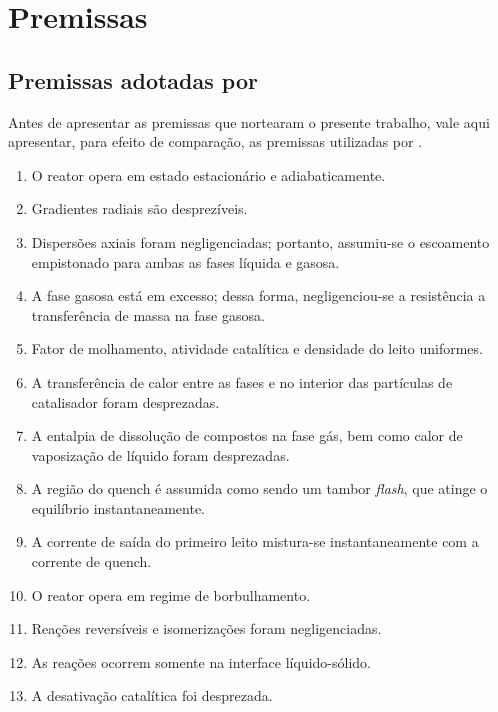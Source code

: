 
\section{Premissas} \label{sec:premissas}

\subsection{Premissas adotadas por }
\label{sec:premissasrojas}

Antes de apresentar as premissas que nortearam o presente trabalho, vale
aqui apresentar, para efeito de comparação, as premissas utilizadas por
.

\begin{enumerate}
  \item O reator opera em estado estacionário e adiabaticamente.
  \item Gradientes radiais são desprezíveis.
  \item Dispersões axiais foram negligenciadas; portanto, assumiu-se o
  escoamento empistonado para ambas as fases líquida e gasosa.
  \item A fase gasosa está em excesso; dessa forma, negligenciou-se a
  resistência a transferência de massa na fase gasosa.
  \item Fator de molhamento, atividade catalítica e densidade do leito
  uniformes.
  \item A transferência de calor entre as fases e no interior das partículas de
  catalisador foram desprezadas.
  \item A entalpia de dissolução de compostos na fase gás, bem como calor de
  vaposização de líquido foram desprezadas.
  \item A região do quench é assumida como sendo um tambor \emph{flash}, que atinge o
  equilíbrio instantaneamente.
  \item A corrente de saída do primeiro leito mistura-se instantaneamente com a
  corrente de quench.
  \item O reator opera em regime de borbulhamento.
  \item Reações reversíveis e isomerizações foram negligenciadas.
  \item As reações ocorrem somente na interface líquido-sólido.
  \item A desativação catalítica foi desprezada.
\end{enumerate}

